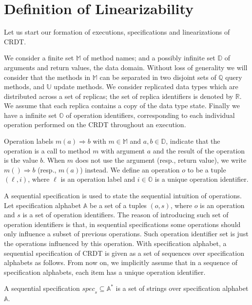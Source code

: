 

\section{Definition of Linearizability}
\label{sec:definition of linearizability} 

Let us start our formation of executions, specifications and linearizations of CRDT.  

We consider a finite set $\mathbb{M}$ of method names; and a possibly infinite set $\mathbb{D}$ of arguments and return values, the data domain. Without loss of generality we will consider that the methods in $\mathbb{M}$ can be separated in two disjoint sets of $\mathbb{Q}$ query methods, and $\mathbb{U}$ update methods. We consider replicated data types which are distributed across a set of replicas; the set of replica identifiers is denoted by $\mathbb{R}$. We assume that each replica contains a copy of the data type state. Finally we have a infinite set $\mathbb{O}$ of operation identifiers, corresponding to each individual operation performed on the CRDT throughout an execution.

Operation labels \mbox{$m(a)\Rightarrow b$} with $m \in \mathbb{M}$ and $a,b \in \mathbb{D}$, indicate that the operation is a call to method $m$ with argument $a$ and the result of the operation is the value $b$. When $m$ does not use the argument (resp., return value), we write $m()\Rightarrow b$ (resp., $m(a)$) instead. We define an operation $o$ to be a tuple $(\ell,i)$, where $\ell$ is an operation label and $i \in \mathbb{O}$ is a unique operation identifier. 

 A sequential specification is used to state the sequential intuition of operations. Let specification alphabet $\mathbb{A}$ be a set of a tuples $(o,s)$, where $o$ is an operation and $s$ is a set of operation identifiers. The reason of introducing such set of operation identifiers is that, in sequential specifications some operations should only influence a subset of previous operations. Such operation identifier set is just the operations influenced by this operation. With specification alphabet, a sequential specification of CRDT is given as a set of sequences over specification alphabets as follows. From now on, we implicitly assume that in a sequence of specification alphabets, each item has a unique operation identifier. 

\begin{definition}
\label{definition:sequential specification} 
A sequential specification $\mathit{spec}_s \subseteq \mathbb{A}^*$ is a set of strings over specification alphabet $\mathbb{A}$. 
\end{definition} 

